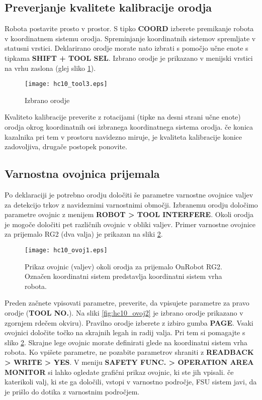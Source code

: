 \subsection*{Preverjanje kvalitete kalibracije orodja}

Robota postavite prosto v prostor. S tipko \textbf{COORD} izberete premikanje robota v koordinatnem sistemu orodja. Spreminjanje koordinatnih
sistemov spremljate v statusni vrstici. Deklarirano orodje morate nato izbrati s pomočjo učne enote s tipkama\textbf{ SHIFT + TOOL SEL}. Izbrano orodje je prikazano v menijski vrstici na vrhu zaslona (glej sliko \ref{fig:hc10_tool3}).

\begin{figure}[!hbt]
	\centering
	\texttt{[image: hc10\_tool3.eps]}
	\caption{Izbrano orodje}
	\label{fig:hc10_tool3}
\end{figure}

Kvaliteto kalibracije preverite z rotacijami (tipke na desni strani učne enote) orodja okrog koordinatnih osi izbranega koordinatnega sistema orodja. če konica kazalnika pri tem v prostoru navidezno miruje, je kvaliteta kalibracije konice zadovoljiva, drugače postopek ponovite.

\subsection*{Varnostna ovojnica prijemala}

Po deklaraciji je potrebno orodju določiti še parametre varnostne ovojnice valjev za detekcijo trkov z navideznimi varnostnimi območji. Izbranemu orodju določimo parametre ovojnic z menijem \textbf{ROBOT > TOOL INTERFERE}. Okoli orodja je mogoče določiti pet različnih ovojnic v obliki valjev. Primer varnostne ovojnice za prijemalo RG2 (dva valja) je prikazan na sliki \ref{fig:hc10_ovoj1}.

\begin{figure}[!hbt]
	\centering
	\texttt{[image: hc10\_ovoj1.eps]}
	\caption{Prikaz ovojnic (valjev) okoli orodja za prijemalo OnRobot RG2. Označen koordinatni sistem predstavlja koordinatni sistem vrha robota.}
	\label{fig:hc10_ovoj1}
\end{figure}

Preden začnete vpisovati parametre, preverite, da vpisujete parametre za pravo orodje (\textbf{TOOL NO.}). Na sliki \ref{fig:hc10_ovoj2} je izbrano orodje prikazano v zgornjem rdečem okviru). Pravilno orodje izberete z izbiro gumba \textbf{PAGE}. Vsaki ovojnici določite točko na skrajnih legah in radij valja. Pri tem si pomagajte s sliko \ref{fig:hc10_ovoj1}. Skrajne lege ovojnic morate definirati glede na koordinatni sistem vrha robota. Ko vpišete parametre, ne pozabite parametrov shraniti z \textbf{READBACK > WRITE > YES}. V meniju \textbf{SAFETY FUNC. > OPERATION AREA MONITOR} si lahko ogledate grafični prikaz ovojnic, ki ste jih vpisali. če katerikoli valj, ki ste ga določili, vstopi v varnostno področje, FSU sistem javi, da je prišlo do dotika z varnostnim področjem.

